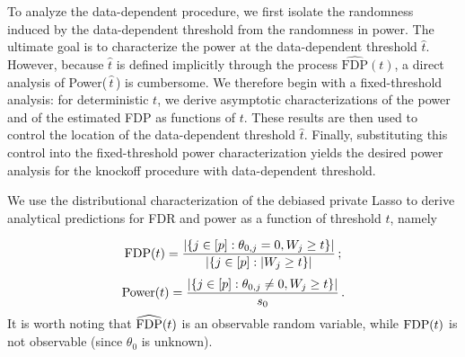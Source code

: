\documentclass[11pt]{article}
\newcommand{\FDP}{{\rm FDP}}
\newcommand{\Power}{{\rm Power}}
\newcommand{\wht}{\widehat{t}}
\begin{document}
To analyze the data-dependent procedure, we first isolate the randomness induced by the data-dependent threshold from the randomness in power. The ultimate goal is to characterize the power at the data-dependent threshold $\wht$. However, because $\wht$ is defined implicitly through the process $\widehat{\mathrm{FDP}}(t)$, a direct analysis of Power($\,\wht\,$) is cumbersome. We therefore begin with a fixed-threshold analysis: for deterministic $t$, we derive asymptotic characterizations of the power and of the estimated FDP as functions of $t$. These results are then used to control the location of the data-dependent threshold $ \wht$. Finally, substituting this control into the fixed-threshold power characterization yields the desired power analysis for the knockoff procedure with data-dependent threshold.


We use the distributional characterization of the debiased private Lasso to derive analytical predictions for FDR and power as a function of threshold $t$, namely

\begin{equation}\label{eq:FDP_t}
    \FDP(t) = \frac{|\{j\in[p]:\theta_{0,j}=0,W_j\geq t\}|}{|\{j\in[p]:| W_j\geq t\}|}\,;
\end{equation}
\begin{equation}\label{eq:power_t}
    \Power(t) = \frac{|\{j\in[p]:\theta_{0,j}\neq0,W_j\geq t\}|}{s_0}\,.
\end{equation}
It is worth noting that $\widehat{\FDP}(t)$ is an observable random variable, while $\FDP(t)$ is not observable (since $\theta_0$ is unknown).
\end{document}
